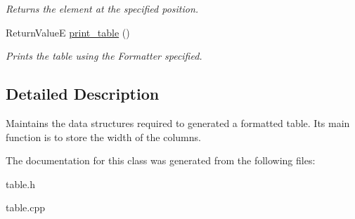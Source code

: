 \begin{DoxyCompactItemize}
\begin{DoxyCompactList}\small\item\em Returns the element at the specified position. \end{DoxyCompactList}\item 
\hypertarget{classTable_a6cd0418b59cf0e6e1552587e3d84a776}{}Return\+Value\+E \hyperlink{classTable_a6cd0418b59cf0e6e1552587e3d84a776}{print\+\_\+table} ()\label{classTable_a6cd0418b59cf0e6e1552587e3d84a776}

\begin{DoxyCompactList}\small\item\em Prints the table using the Formatter specified. \end{DoxyCompactList}\end{DoxyCompactItemize}


\subsection{Detailed Description}
Maintains the data structures required to generated a formatted table. It\textquotesingle{}s main function is to store the width of the columns. 

The documentation for this class was generated from the following files\+:\begin{DoxyCompactItemize}
\item 
table.\+h\item 
table.\+cpp\end{DoxyCompactItemize}
